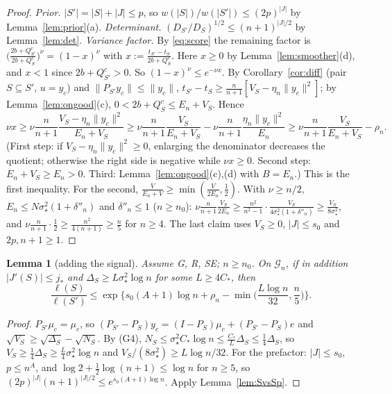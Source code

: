 \documentclass[11pt]{article}
\newtheorem{lemma}[theorem]{Lemma}
\theoremstyle{definition}
\newcommand{\1}{\mathbf 1}
\newcommand{\Gn}{\mathcal G_n}
\newcommand{\sst}{\sigma_\star^2}
\begin{document}
\begin{proof}
\emph{Prior.} $|S'|=|S|+|J|\le p$, so $w(|S|)/w(|S'|)\le(2p)^{|J|}$ by Lemma~\ref{lem:prior}(a).
\emph{Determinant.} $(D_{S'}/D_S)^{1/2}\le(n+1)^{|J|/2}$ by Lemma~\ref{lem:det}.
\emph{Variance factor.} By \eqref{eq:score} the remaining factor is $\big(\frac{2b+Q^c_{S'}}{2b+Q^c_S}\big)^\nu=(1-x)^\nu$ with $x:=\frac{t_{S'}-t_S}{2b+Q^c_S}$. Here $x\ge0$ by Lemma~\ref{lem:smoother}(d), and $x<1$ since $2b+Q^c_{S'}>0$. So $(1-x)^\nu\le e^{-\nu x}$. By Corollary~\ref{cor:diff} (pair $S\subseteq S'$, $u=y_c$) and $\|P_{S'}y_c\|\le\|y_c\|$, $t_{S'}-t_S\ge\frac n{n+1}[V_S-\eta_n\|y_c\|^2]$; by Lemma~\ref{lem:ongood}(c), $0<2b+Q^c_S\le E_n+V_S$. Hence
\[
\nu x\ge\nu\frac n{n+1}\frac{V_S-\eta_n\|y_c\|^2}{E_n+V_S}\ge\nu\frac n{n+1}\frac{V_S}{E_n+V_S}-\nu\frac n{n+1}\frac{\eta_n\|y_c\|^2}{E_n}\ge\nu\frac n{n+1}\frac{V_S}{E_n+V_S}-\rho_n .
\]
(First step: if $V_S-\eta_n\|y_c\|^2\ge0$, enlarging the denominator decreases the quotient; otherwise the right side is negative while $\nu x\ge0$. Second step: $E_n+V_S\ge E_n>0$. Third: Lemma~\ref{lem:ongood}(c),(d) with $B=E_n$.) This is the first inequality.
For the second, $\frac V{E_n+V}\ge\min(\frac V{2E_n},\frac12)$. With $\nu\ge n/2$, $E_n\le N\sst(1+\delta''_n)$ and $\delta''_n\le1$ ($n\ge n_0$): $\nu\frac n{n+1}\frac{V_S}{2E_n}\ge\frac{n^2}{n^2-1}\cdot\frac{V_S}{4\sst(1+\delta''_n)}\ge\frac{V_S}{8\sst}$, and $\nu\frac n{n+1}\cdot\frac12\ge\frac{n^2}{4(n+1)}\ge\frac n5$ for $n\ge4$. The last claim uses $V_S\ge0$, $|J|\le s_0$ and $2p,n+1\ge1$.
\end{proof}

\begin{lemma}[adding the signal]\label{lem:signalgain}
Assume G, R, SE; $n\ge n_0$. On $\Gn$, if in addition $|J'(S)|\le j_*$ and $\Delta_S\ge L\sst\log n$ for some $L\ge4C_*$, then
\[
\frac{\ell(S)}{\ell(S')}\le\exp\Big\{s_0(A+1)\log n+\rho_n-\min\Big(\frac{L\log n}{32},\frac n5\Big)\Big\}.
\]
\end{lemma}

\begin{proof}
$P_{S'}\mu_c=\mu_c$, so $(P_{S'}-P_S)y_c=(I-P_S)\mu_c+(P_{S'}-P_S)e$ and $\sqrt{V_S}\ge\sqrt{\Delta_S}-\sqrt{N_S}$. By (G4), $N_S\le\sst C_*\log n\le\frac{C_*}L\Delta_S\le\frac14\Delta_S$, so $V_S\ge\frac14\Delta_S\ge\frac L4\sst\log n$ and $V_S/(8\sst)\ge L\log n/32$. For the prefactor: $|J|\le s_0$, $p\le n^A$, and $\log2+\frac12\log(n+1)\le\log n$ for $n\ge5$, so $(2p)^{|J|}(n+1)^{|J|/2}\le e^{s_0(A+1)\log n}$. Apply Lemma~\ref{lem:SvsSp}.
\end{proof}
\end{document}
